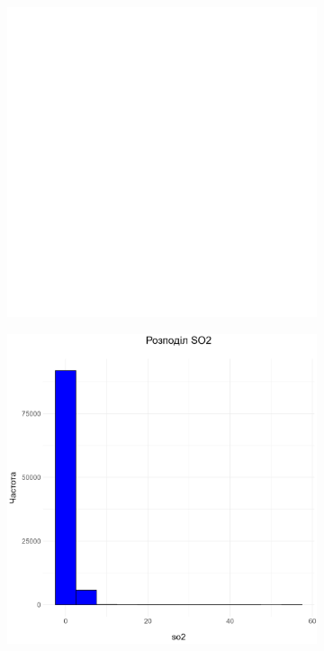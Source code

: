 \documentclass{article}
\begin{document}
\begin{enumerate}
    \begin{figure}[h!]
        \centering
        \begin{subfigure}[b]{0.4\linewidth}
            \includegraphics[width=\linewidth]{plots/question2/o3_plot.png}
        \end{subfigure}
        \begin{subfigure}[b]{0.4\linewidth}
            \includegraphics[width=\linewidth]{plots/question2/so2_plot.png}
        \end{subfigure}
    \end{figure}
    

\end{enumerate}
\end{document}
